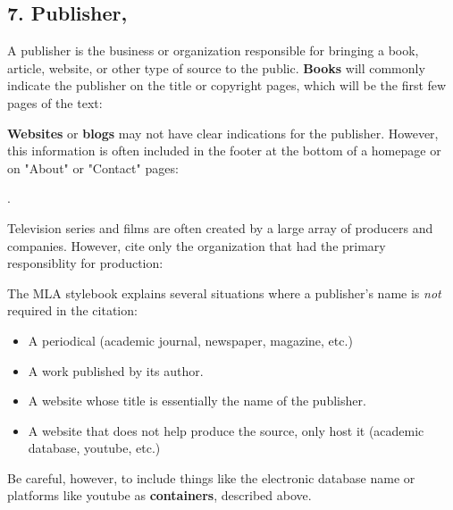 

\subsection{7. Publisher,}

A publisher is the business or organization responsible for bringing a book, article, website, or other type of source to the public. \textbf{Books} will commonly indicate the publisher on the title or copyright pages, which will be the first few pages of the text: \bigskip 

\bigskip

\noindent \textbf{Websites} or \textbf{blogs} may not have clear indications for the publisher. However, this information is often included in the footer at the bottom of a homepage or on "About" or "Contact" pages: \medskip

. \bigskip

\noindent Television series and films are often created by a large array of producers and companies. However, cite only the organization that had the primary responsiblity for production:\bigskip 

\bigskip



\begin{center}
\begin{tcolorbox}[colframe=oyster, coltitle=black, sharp corners, title=\ding{52} When \emph{not} to include the publisher]
The MLA stylebook explains several situations where a publisher's name is \emph{not} required in the citation: 

\begin{itemize}
\item A periodical (academic journal, newspaper, magazine, etc.)
\item A work published by its author.
\item A website whose title is essentially the name of the publisher.
\item A website that does not help produce the source, only host it (academic database, youtube, etc.)
\end{itemize}

\medskip

Be careful, however, to include things like the electronic database name or platforms like youtube as \textbf{containers}, described above.


\end{tcolorbox}
\end{center}




